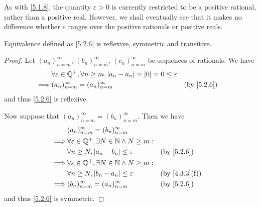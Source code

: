 \begin{rmk}\label{5.2.7}
  As with \cref{5.1.8}, the quantity \(\varepsilon > 0\) is currently restricted to be a positive rational, rather than a positive real.
  However, we shall eventually see that it makes no difference whether \(\varepsilon\) ranges over the positive rationals or positive reals.
\end{rmk}

\begin{ac}\label{ac:5.2.1}
  Equivalence defined as \cref{5.2.6} is reflexive, symmetric and transitive.
\end{ac}

\begin{proof}
  Let \((a_n)_{n = m}^\infty\), \((b_n)_{n = m}^\infty\), \((c_n)_{n = m}^\infty\) be sequences of rationals.
  We have
  \begin{align*}
             & \forall \varepsilon \in \Q^+, \forall n \geq m, \abs{a_n - a_n} = \abs{0} = 0 \leq \varepsilon                 \\
    \implies & (a_n)_{n = m}^\infty = (a_n)_{n = m}^\infty                                                    &  & \by{5.2.6}
  \end{align*}
  and thus \cref{5.2.6} is reflexive.

  Now suppose that \((a_n)_{n = m}^\infty = (b_n)_{n = m}^\infty\).
  Then we have
  \begin{align*}
             & (a_n)_{n = m}^\infty = (b_n)_{n = m}^\infty                                                     \\
    \implies & \forall \varepsilon \in \Q^+, \exists N \in \N \land N \geq m:                                  \\
             & \forall n \geq N, \abs{a_n - b_n} \leq \varepsilon             &  & \by{5.2.6}                  \\
    \implies & \forall \varepsilon \in \Q^+, \exists N \in \N \land N \geq m:                                  \\
             & \forall n \geq N, \abs{b_n - a_n} \leq \varepsilon             &  & \text{(by \cref{4.3.3}(f))} \\
    \implies & (b_n)_{n = m}^\infty = (a_n)_{n = m}^\infty                    &  & \by{5.2.6}
  \end{align*}
  and thus \cref{5.2.6} is symmetric.


\end{proof}
